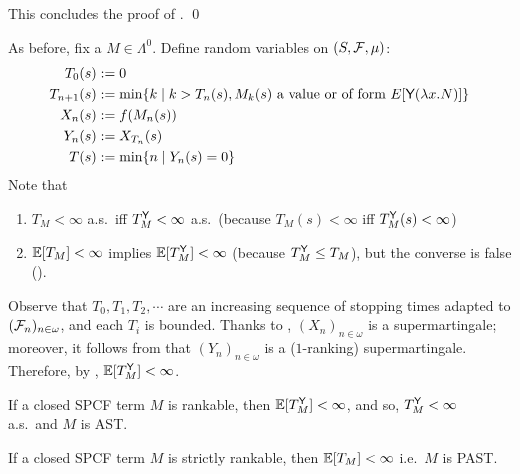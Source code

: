 \iffalse
[** To see $f_{2, n+1}(M) \leq f(M_n)[T_2]$, take $s \in T_2$. Then $f_{2, n+1}(M)(s) = f(E[\underline{a}])$ and $M_n = E[\tsample]$, for some $a \in [0, 1]$ and evaluation context $E$. Hence 
\[
f_{2, n+1}(M)(s) \leq \int_I f(E[\underline{r}]) \, \mu_{leb}(\textrm{d} r)
\leq f(E[\tsample]) = f(M_n)[T_2](s).
\]
**]
\fi
This concludes the proof of . \hfill \qed

\medskip
As before, fix a $M \in \Lambda^0$.
Define random variables on $(S, \mathcal{F}, \mu)$:
\begin{align*}
T_0(s) & := 0 \\
T_{n+1}(s) & := \min \{ k \mid k>T_n(s), M_k(s) \textrm{ a value or of form } E[\textsf{Y} (\lambda x. N)] \}\\
X_n(s) & := f(M_n(s)) \\
Y_n(s) & := X_{T_n}(s) \\
T(s) &:= \min \{n \mid Y_n(s) = 0\}
\end{align*}
Note that 
\begin{enumerate}
\item $T_M < \infty$ a.s.~iff $T_M^{\textsf{Y}} < \infty$ a.s.~(because $T_M(s) < \infty$ iff $T_M^{\textsf{Y}}(s) < \infty$)
\item $\mathbb{E}[T_M] <{} \infty$ implies $\mathbb{E}[T_M^{\textsf{Y}}] < \infty$ (because $T_M^{\textsf{Y}} \leq T_M$), but the converse is false ().
\end{enumerate}

Observe that $T_0, T_1, T_2, \cdots$ are an increasing sequence of stopping times adapted to $(\mathcal{F}_n)_{n \in \omega}$, and each $T_i$ is bounded.
Thanks to , 
$(X_n)_{n \in \omega}$ is a supermartingale;
moreover, it follows from  that $(Y_n)_{n \in \omega}$ is a ($1$-ranking) supermartingale.
Therefore, by , $\mathbb{E}[T^{\textsf{Y}}_M] < \infty$.

\begin{corollary}
If a closed SPCF term $M$ is rankable, then $\mathbb{E}[T^{\textsf{Y}}_M] < \infty$, and so, $T^{\textsf{Y}}_M < \infty$ a.s.~and $M$ is AST. 

If a closed SPCF term $M$ is strictly rankable, then $\mathbb{E}[T_M] < \infty$ i.e.~$M$ is PAST.
\end{corollary}

